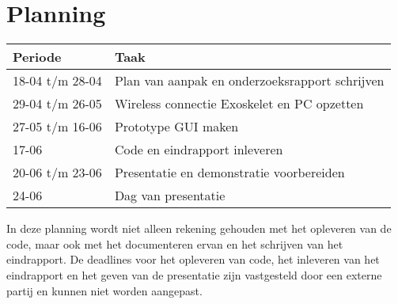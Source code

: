 \section{Planning}
{\renewcommand{\arraystretch}{1.5}
\begin{tabular}{ | l | l | }
	\hline
	\bfseries{Periode} & \bfseries{Taak} \\ \hline
	18-04 t/m 28-04 & Plan van aanpak en onderzoeksrapport schrijven\\ \hline
	29-04 t/m 26-05 & Wireless connectie Exoskelet en PC opzetten   \\ \hline
	27-05 t/m 16-06 & Prototype GUI maken \\ \hline
	17-06 & Code en eindrapport inleveren \\ \hline
	20-06 t/m 23-06 & Presentatie en demonstratie voorbereiden \\ \hline
	24-06 & Dag van presentatie \\ \hline
\end{tabular}
}

In deze planning wordt niet alleen rekening gehouden met het opleveren van de code, maar ook met het documenteren ervan en het schrijven van het eindrapport. De deadlines voor het opleveren van code, het inleveren van het eindrapport en het geven van de presentatie zijn vastgesteld door een externe partij en kunnen niet worden aangepast.

